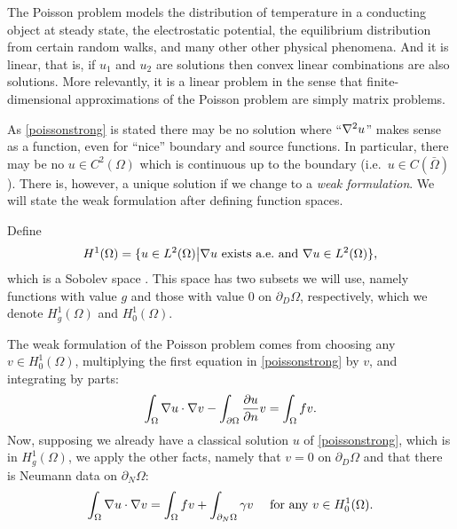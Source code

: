 The Poisson problem models the distribution of temperature in a conducting object at steady state, the electrostatic potential, the equilibrium distribution from certain random walks, and many other other physical phenomena.  And it is linear, that is, if $u_1$ and $u_2$ are solutions then convex linear combinations are also solutions.  More relevantly, it is a linear problem in the sense that finite-dimensional approximations of the Poisson problem are simply matrix problems.

As \eqref{poissonstrong} is stated there may be no solution where ``$\nabla^2 u$'' makes sense as a function, even for ``nice'' boundary and source functions.  In particular, there may be no $u\in C^2(\Omega)$ which is continuous up to the boundary (i.e.~$u\in C(\bar\Omega)$).  There is, however, a unique solution if we change to a \emph{weak formulation}.  We will state the weak formulation after defining function spaces.

Define
    $$H^1(\Omega) = \{u\in L^2(\Omega) \big| \nabla u \text{ exists a.e.~and } \nabla u \in L^2(\Omega)\},$$
which is a Sobolev space \citep{Evans}.  This space has two subsets we will use, namely functions with value $g$ and those with value $0$ on $\partial_D \Omega$, respectively, which we denote $H_g^1(\Omega)$ and $H_0^1(\Omega)$.

The weak formulation of the Poisson problem comes from choosing any $v\in H_0^1(\Omega)$, multiplying the first equation in \eqref{poissonstrong} by $v$, and integrating by parts:
\begin{equation*}
\int_\Omega \nabla u \cdot \nabla v - \int_{\partial\Omega} \frac{\partial u}{\partial n} v = \int_\Omega f v.
\end{equation*}
Now, supposing we already have a classical solution $u$ of \eqref{poissonstrong}, which is in $H_g^1(\Omega)$, we apply the other facts, namely that $v=0$ on $\partial_D\Omega$ and that there is Neumann data on $\partial_N\Omega$:
\begin{equation}
\int_\Omega \nabla u \cdot \nabla v = \int_\Omega f v + \int_{\partial_N\Omega} \gamma v\quad \text{ for any } v\in H_0^1(\Omega). \label{poissonweak}
\end{equation}


